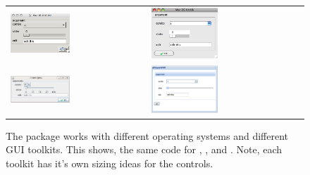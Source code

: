\begin{figure}
  \centering
  \begin{tabular}{ll}
     \includegraphics[width=0.45\textwidth]{ex-33-macosx-rgtk2} &
     \includegraphics[width=0.45\textwidth]{fig-gWidgets-ex-33-tlctk}\\
     \includegraphics[width=0.45\textwidth]{ex-33-linux-rJava} &
     \includegraphics[width=0.45\textwidth]{ex-33-gWidgetsWWW}
 \end{tabular}
 \caption{The  package works with different operating systems and different GUI toolkits. This shows, the same code for , ,  and . Note, each toolkit has it's own sizing ideas for the controls.}
  \label{fig:gWidgets-three-oses}
\end{figure}

